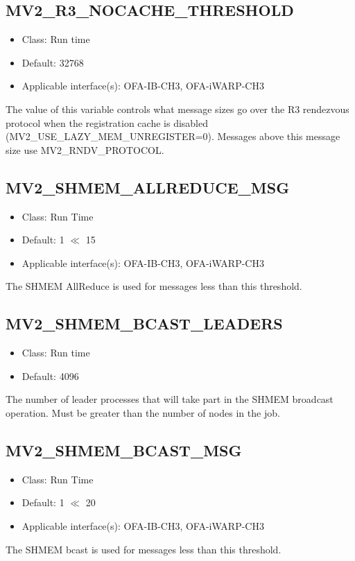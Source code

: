 \subsection{MV2\_R3\_NOCACHE\_THRESHOLD}
\begin{itemize}
    \item Class: Run time
    \item Default: 32768
    \item Applicable interface(s): OFA-IB-CH3, OFA-iWARP-CH3
\end{itemize}

The value of this variable controls what message sizes go over the 
R3 rendezvous protocol when the registration cache is disabled (MV2\_USE\_LAZY\_MEM\_UNREGISTER=0). Messages above this message size use
MV2\_RNDV\_PROTOCOL. 

\subsection{MV2\_SHMEM\_ALLREDUCE\_MSG}
\label{def:mv2-shmem-coll-allreduce-threshold}
\begin{itemize}
    \item Class: Run Time
    \item Default: 1 $\ll$ 15
    \item Applicable interface(s): OFA-IB-CH3, OFA-iWARP-CH3
\end{itemize}

The SHMEM AllReduce is used for messages less than this threshold.

\subsection{MV2\_SHMEM\_BCAST\_LEADERS}
\label{def:mv2-shmem-bcast-leaders}

\begin{itemize}
        \item Class: Run time
        \item Default: 4096
\end{itemize}

The number of leader processes that will take part in the SHMEM
broadcast operation. Must be greater than the number of nodes in the
job.

\subsection{MV2\_SHMEM\_BCAST\_MSG}
\label{def:mv2-shmem-coll-bcast-threshold}
\begin{itemize}
    \item Class: Run Time
    \item Default: 1 $\ll$ 20
    \item Applicable interface(s): OFA-IB-CH3, OFA-iWARP-CH3
\end{itemize}
The SHMEM bcast is used for messages less than this threshold.

